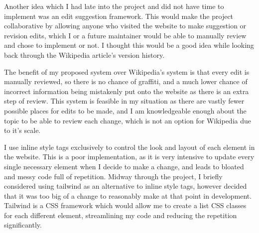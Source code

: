 \documentclass{l4proj}
\begin{document}
Another idea which I had late into the project and did not have time to implement was an edit suggestion framework.  This would make the project collaborative by allowing anyone who visited the website to make suggestion or revision edits, which I or a future maintainer would be able to manually review and chose to implement or not.  I thought this would be a good idea while looking back through the Wikipedia article's version history.

The benefit of my proposed system over Wikipedia's system is that every edit is manually reviewed, so there is no chance of graffiti, and a much lower chance of incorrect information being mistakenly put onto the website as there is an extra step of review.  This system is feasible in my situation as there are vastly fewer possible places for edits to be made, and I am knowledgeable enough about the topic to be able to review each change, which is not an option for Wikipedia due to it's scale.

I use inline style tags exclusively to control the look and layout of each element in the website.  This is a poor implementation, as it is very intensive to update every single necessary element when I decide to make a change, and leads to bloated and messy code full of repetition.  Midway through the project, I briefly considered using tailwind as an alternative to inline style tags, however decided that it was too big of a change to reasonably make at that point in development. Tailwind is a CSS framework which would allow me to create a list CSS classes for each different element, streamlining my code and reducing the repetition significantly. 

%
% 
\end{document}

